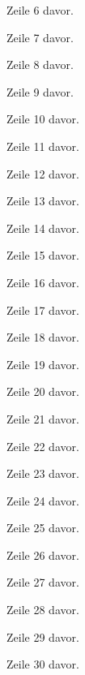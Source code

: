 Zeile 6 davor.

Zeile 7 davor.

Zeile 8 davor.

Zeile 9 davor.

Zeile 10 davor.

Zeile 11 davor.

Zeile 12 davor.

Zeile 13 davor.

Zeile 14 davor.

Zeile 15 davor.

Zeile 16 davor.

Zeile 17 davor.

Zeile 18 davor.

Zeile 19 davor.

Zeile 20 davor.

Zeile 21 davor.

Zeile 22 davor.

Zeile 23 davor.

Zeile 24 davor.

Zeile 25 davor.

Zeile 26 davor.

Zeile 27 davor.

Zeile 28 davor.

Zeile 29 davor.

Zeile 30 davor.

